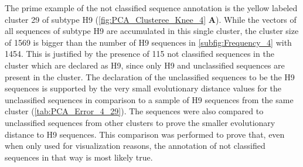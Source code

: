 \begin{table}[!hbt]
    \centering
    \caption[Unclassified sequences in segment 4 cluster 29 with PK]{\textbf{Unclassified sequences in segment 4 cluster 29 with PK.} The \glspl{MSA} mean distance of the given sequences in comparison to a sample of H9 sequences of the same cluster and a sample of unclassified sequences present in other clusters. Only the first 20 columns are presented here, the full table can be found in the projects GitHub Repository\footnotemark.}
    \label{tab:PCA_Error_4_29}
\end{table}

The prime example of the not classified sequence annotation is the yellow labeled cluster 29 of subtype H9 (\autoref{fig:PCA_Clusteree_Knee_4} \textbf{\textsf{A}}). While the vectors of all sequences of subtype H9 are accumulated in this single cluster, the cluster size of 1569 is bigger than the number of H9 sequences in \autoref{subfig:Frequency_4} with 1454. This is justified by the presence of 115 not classified sequences in the cluster which are declared as H9, since only H9 and unclassified sequences are present in the cluster. The declaration of the unclassified sequences to be the H9 sequences is supported by the very small evolutionary distance values for the unclassified sequences in comparison to a sample of H9 sequences from the same cluster (\autoref{tab:PCA_Error_4_29}). The sequences were also compared to unclassified sequences from other clusters to prove the smaller evolutionary distance to H9 sequences. This comparison was performed to prove that, even when only used for visualization reasons, the annotation of not classified sequences in that way is most likely true.


